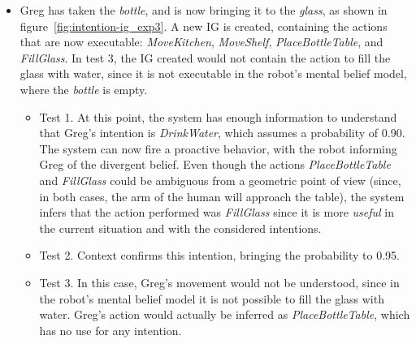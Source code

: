 \begin{itemize}
\begin{itemize}
		\end{itemize} 
	\item Greg has taken the \textit{bottle}, and is now bringing it to the \textit{glass}, as shown in figure~\ref{fig:intention-ig_exp3}. A new IG is created, containing the actions that are now executable: \textit{MoveKitchen}, \textit{MoveShelf}, \textit{PlaceBottleTable}, and \textit{FillGlass}. In test 3, the IG created would not contain the action to fill the glass with water, since it is not executable in the robot's mental belief model, where the \textit{bottle} is empty.
		\begin{itemize}
			\item Test 1. At this point, the system has enough information to understand that Greg's intention is \textit{DrinkWater}, which assumes a probability of 0.90. The system can now fire a proactive behavior, with the robot informing Greg of the divergent belief. Even though the actions \textit{PlaceBottleTable} and \textit{FillGlass} could be ambiguous from a geometric point of view (since, in both cases, the arm of the human will approach the table), the system infers that the action performed was \textit{FillGlass} since it is more \textit{useful} in the current situation and with the considered intentions.
			\item Test 2. Context confirms this intention, bringing the probability to 0.95.
			\item Test 3. In this case, Greg's movement would not be understood, since in the robot's mental belief model it is not possible to fill the glass with water. Greg's action would actually be inferred as \textit{PlaceBottleTable}, which has no use for any intention.
		\end{itemize}
\end{itemize}

